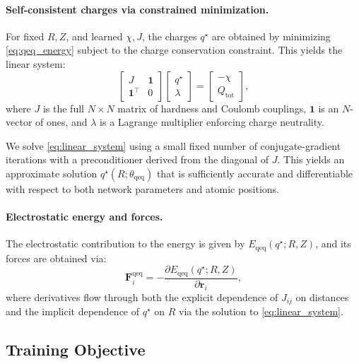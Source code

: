 \documentclass{article}
\begin{document}
\paragraph{Self-consistent charges via constrained minimization.}
For fixed $R, Z$, and learned $\chi, J$, the charges $q^\star$ are obtained by minimizing \eqref{eq:qeq_energy} subject to the charge conservation constraint. This yields the linear system:
\begin{equation}
    \begin{bmatrix}
        J & \mathbf{1} \\
        \mathbf{1}^\top & 0
    \end{bmatrix}
    \begin{bmatrix}
        q^\star \\
        \lambda
    \end{bmatrix}
    =
    \begin{bmatrix}
        -\chi \\
        Q_{\text{tot}}
    \end{bmatrix},
    \label{eq:linear_system}
\end{equation}
where $J$ is the full $N \times N$ matrix of hardness and Coulomb couplings, $\mathbf{1}$ is an $N$-vector of ones, and $\lambda$ is a Lagrange multiplier enforcing charge neutrality.

We solve \eqref{eq:linear_system} using a small fixed number of conjugate-gradient iterations with a preconditioner derived from the diagonal of $J$. This yields an approximate solution $q^\star(R; \theta_{\text{qeq}})$ that is sufficiently accurate and differentiable with respect to both network parameters and atomic positions.

\paragraph{Electrostatic energy and forces.}
The electrostatic contribution to the energy is given by $E_{\text{qeq}}(q^\star; R, Z)$, and its forces are obtained via:
\begin{equation}
    \mathbf{F}_i^{\text{qeq}} = -\frac{\partial E_{\text{qeq}}(q^\star; R, Z)}{\partial \mathbf{r}_i},
\end{equation}
where derivatives flow through both the explicit dependence of $J_{ij}$ on distances and the implicit dependence of $q^\star$ on $R$ via the solution to \eqref{eq:linear_system}.

\subsection{Training Objective}
\end{document}
